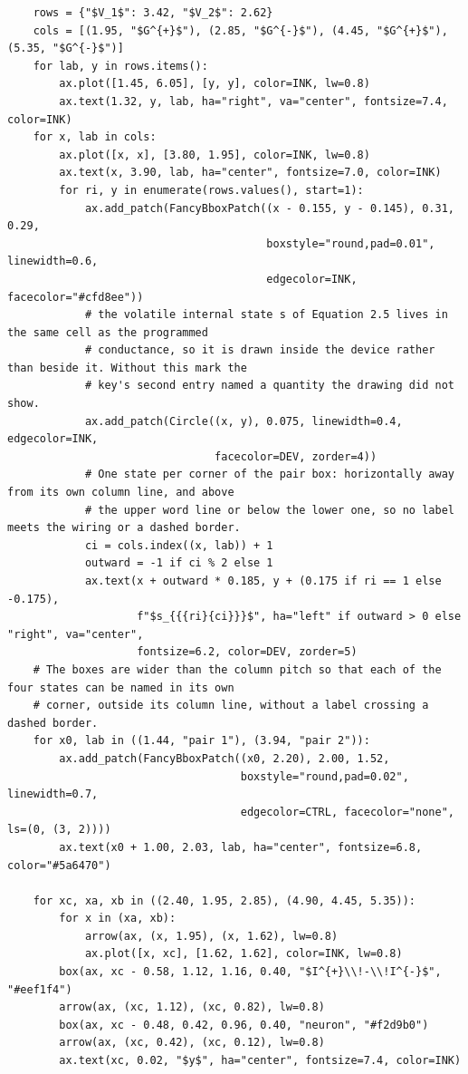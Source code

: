 \documentclass[a4paper,10pt]{article}
\begin{document}
\begin{Verbatim}
    rows = {"$V_1$": 3.42, "$V_2$": 2.62}
    cols = [(1.95, "$G^{+}$"), (2.85, "$G^{-}$"), (4.45, "$G^{+}$"), (5.35, "$G^{-}$")]
    for lab, y in rows.items():
        ax.plot([1.45, 6.05], [y, y], color=INK, lw=0.8)
        ax.text(1.32, y, lab, ha="right", va="center", fontsize=7.4, color=INK)
    for x, lab in cols:
        ax.plot([x, x], [3.80, 1.95], color=INK, lw=0.8)
        ax.text(x, 3.90, lab, ha="center", fontsize=7.0, color=INK)
        for ri, y in enumerate(rows.values(), start=1):
            ax.add_patch(FancyBboxPatch((x - 0.155, y - 0.145), 0.31, 0.29,
                                        boxstyle="round,pad=0.01", linewidth=0.6,
                                        edgecolor=INK, facecolor="#cfd8ee"))
            # the volatile internal state s of Equation 2.5 lives in the same cell as the programmed
            # conductance, so it is drawn inside the device rather than beside it. Without this mark the
            # key's second entry named a quantity the drawing did not show.
            ax.add_patch(Circle((x, y), 0.075, linewidth=0.4, edgecolor=INK,
                                facecolor=DEV, zorder=4))
            # One state per corner of the pair box: horizontally away from its own column line, and above
            # the upper word line or below the lower one, so no label meets the wiring or a dashed border.
            ci = cols.index((x, lab)) + 1
            outward = -1 if ci % 2 else 1
            ax.text(x + outward * 0.185, y + (0.175 if ri == 1 else -0.175),
                    f"$s_{{{ri}{ci}}}$", ha="left" if outward > 0 else "right", va="center",
                    fontsize=6.2, color=DEV, zorder=5)
    # The boxes are wider than the column pitch so that each of the four states can be named in its own
    # corner, outside its column line, without a label crossing a dashed border.
    for x0, lab in ((1.44, "pair 1"), (3.94, "pair 2")):
        ax.add_patch(FancyBboxPatch((x0, 2.20), 2.00, 1.52,
                                    boxstyle="round,pad=0.02", linewidth=0.7,
                                    edgecolor=CTRL, facecolor="none", ls=(0, (3, 2))))
        ax.text(x0 + 1.00, 2.03, lab, ha="center", fontsize=6.8, color="#5a6470")

    for xc, xa, xb in ((2.40, 1.95, 2.85), (4.90, 4.45, 5.35)):
        for x in (xa, xb):
            arrow(ax, (x, 1.95), (x, 1.62), lw=0.8)
            ax.plot([x, xc], [1.62, 1.62], color=INK, lw=0.8)
        box(ax, xc - 0.58, 1.12, 1.16, 0.40, "$I^{+}\\!-\\!I^{-}$", "#eef1f4")
        arrow(ax, (xc, 1.12), (xc, 0.82), lw=0.8)
        box(ax, xc - 0.48, 0.42, 0.96, 0.40, "neuron", "#f2d9b0")
        arrow(ax, (xc, 0.42), (xc, 0.12), lw=0.8)
        ax.text(xc, 0.02, "$y$", ha="center", fontsize=7.4, color=INK)


\end{Verbatim}
\end{document}
